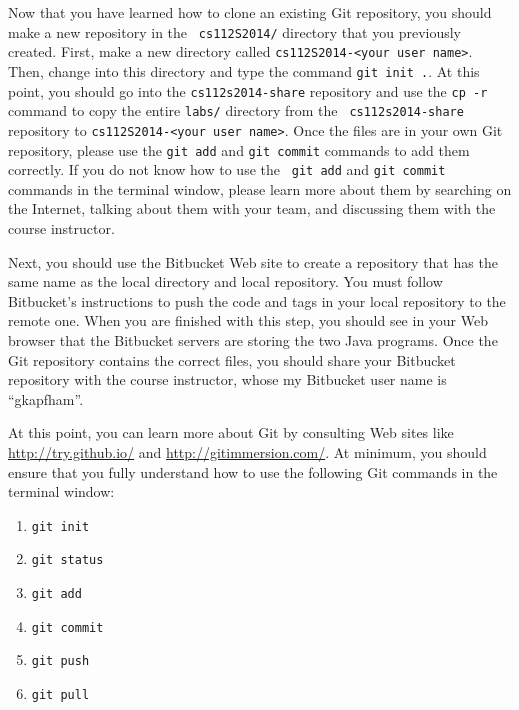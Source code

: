 Now that you have learned how to clone an existing Git repository, you should make a new repository in the {\tt
cs112S2014/} directory that you previously created.  First, make a new directory called {\tt cs112S2014-<your user
name>}. Then, change into this directory and type the command {\tt git init .}.  At this point, you should go into the
{\tt cs112s2014-share} repository and use the {\tt cp -r} command to copy the entire {\tt labs/} directory from the {\tt
cs112s2014-share} repository to {\tt cs112S2014-<your user name>}.  Once the files are in your own Git repository,
please use the {\tt git add} and {\tt git commit} commands to add them correctly. If you do not know how to use the {\tt
git add} and {\tt git commit} commands in the terminal window, please learn more about them by searching on the
Internet, talking about them with your team, and discussing them with the course instructor.

Next, you should use the Bitbucket Web site to create a repository that has the same name as the local directory and
local repository.  You must follow Bitbucket's instructions to push the code and tags in your local repository to the
remote one. When you are finished with this step, you should see in your Web browser that the Bitbucket servers are
storing the two Java programs. Once the Git repository contains the correct files, you should share your Bitbucket
repository with the course instructor, whose my Bitbucket user name is ``gkapfham''.

At this point, you can learn more about Git by consulting Web sites like \url{http://try.github.io/} and
\url{http://gitimmersion.com/}.  At minimum, you should ensure that you fully understand how to use the following Git
commands in the terminal window:

\begin{enumerate} 
			
	\item {\tt git init}

	\item {\tt git status}

	\item {\tt git add} 

	\item {\tt git commit}

	\item {\tt git push}

	\item {\tt git pull} 

\end{enumerate}

